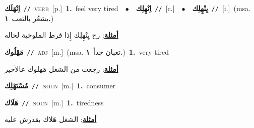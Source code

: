 \documentclass[10pt,a4paper,twoside]{article} %
\begin{document}
\begin{multicols}{2}
{\setlength\topsep{0pt}\textbf{\foreignlanguage{arabic}{اِنْهَلَك}}\ {\color{gray}\texttt{//}\color{black}}\ \textsc{verb}\ [p.]\ \textbf{1.}~feel very tired\ \ $\bullet$\ \ \setlength\topsep{0pt}\textbf{\foreignlanguage{arabic}{اِنْهِلِك}}\ {\color{gray}\texttt{//}\color{black}}\ [c.]\ \ $\bullet$\ \ \setlength\topsep{0pt}\textbf{\foreignlanguage{arabic}{يِنْهِلِك}}\ {\color{gray}\texttt{//}\color{black}}\ [i.]\ \color{gray}(msa. \foreignlanguage{arabic}{يشعُر بالتعب}~\foreignlanguage{arabic}{\textbf{١.}})\color{black}\  \begin{flushright}\color{gray}\foreignlanguage{arabic}{\textbf{\underline{\foreignlanguage{arabic}{أمثلة}}}: رح يِنْهِلِك إِذا فرط الملوخية لحاله}\end{flushright}\color{black}} \vspace{2mm}

{\setlength\topsep{0pt}\textbf{\foreignlanguage{arabic}{مَهْلُوك}}\ {\color{gray}\texttt{//}\color{black}}\ \textsc{adj}\ [m.]\ \color{gray}(msa. \foreignlanguage{arabic}{تعبان جداً}~\foreignlanguage{arabic}{\textbf{١.}})\color{black}\ \textbf{1.}~very tired\  \begin{flushright}\color{gray}\foreignlanguage{arabic}{\textbf{\underline{\foreignlanguage{arabic}{أمثلة}}}: رجعت من الشغل مَهلوك عالأخير}\end{flushright}\color{black}} \vspace{2mm}

{\setlength\topsep{0pt}\textbf{\foreignlanguage{arabic}{مُسْتَهْلِك}}\ {\color{gray}\texttt{//}\color{black}}\ \textsc{noun}\ [m.]\ \textbf{1.}~consumer\ } \vspace{2mm}

{\setlength\topsep{0pt}\textbf{\foreignlanguage{arabic}{هَلَاك}}\ {\color{gray}\texttt{//}\color{black}}\ \textsc{noun}\ [m.]\ \textbf{1.}~tiredness\  \begin{flushright}\color{gray}\foreignlanguage{arabic}{\textbf{\underline{\foreignlanguage{arabic}{أمثلة}}}: الشغل هَلاك بقدرش عليه}\end{flushright}\color{black}} \vspace{2mm}


\end{multicols}
\end{document}
